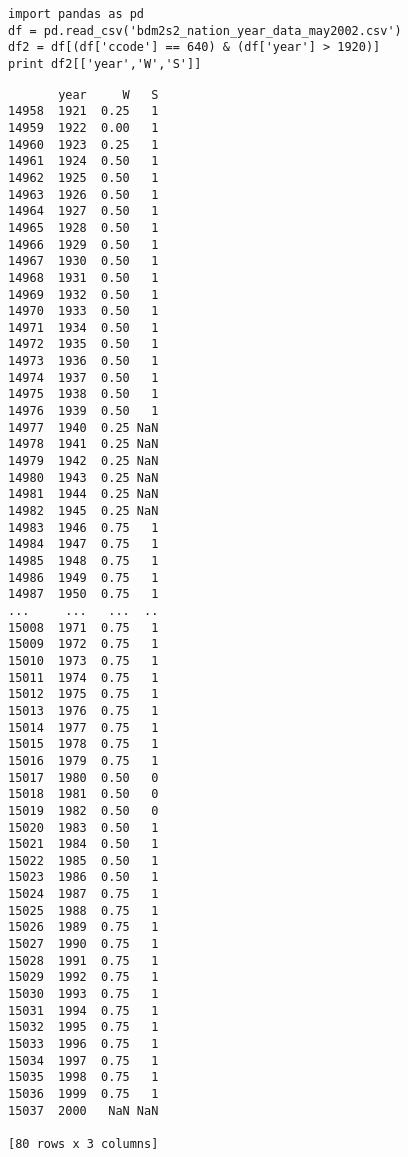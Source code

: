 \documentclass[12pt,fleqn]{article}\usepackage{common}
\begin{document}
\begin{verbatim}
import pandas as pd
df = pd.read_csv('bdm2s2_nation_year_data_may2002.csv')
df2 = df[(df['ccode'] == 640) & (df['year'] > 1920)]
print df2[['year','W','S']]
\end{verbatim}

\begin{verbatim}
       year     W   S
14958  1921  0.25   1
14959  1922  0.00   1
14960  1923  0.25   1
14961  1924  0.50   1
14962  1925  0.50   1
14963  1926  0.50   1
14964  1927  0.50   1
14965  1928  0.50   1
14966  1929  0.50   1
14967  1930  0.50   1
14968  1931  0.50   1
14969  1932  0.50   1
14970  1933  0.50   1
14971  1934  0.50   1
14972  1935  0.50   1
14973  1936  0.50   1
14974  1937  0.50   1
14975  1938  0.50   1
14976  1939  0.50   1
14977  1940  0.25 NaN
14978  1941  0.25 NaN
14979  1942  0.25 NaN
14980  1943  0.25 NaN
14981  1944  0.25 NaN
14982  1945  0.25 NaN
14983  1946  0.75   1
14984  1947  0.75   1
14985  1948  0.75   1
14986  1949  0.75   1
14987  1950  0.75   1
...     ...   ...  ..
15008  1971  0.75   1
15009  1972  0.75   1
15010  1973  0.75   1
15011  1974  0.75   1
15012  1975  0.75   1
15013  1976  0.75   1
15014  1977  0.75   1
15015  1978  0.75   1
15016  1979  0.75   1
15017  1980  0.50   0
15018  1981  0.50   0
15019  1982  0.50   0
15020  1983  0.50   1
15021  1984  0.50   1
15022  1985  0.50   1
15023  1986  0.50   1
15024  1987  0.75   1
15025  1988  0.75   1
15026  1989  0.75   1
15027  1990  0.75   1
15028  1991  0.75   1
15029  1992  0.75   1
15030  1993  0.75   1
15031  1994  0.75   1
15032  1995  0.75   1
15033  1996  0.75   1
15034  1997  0.75   1
15035  1998  0.75   1
15036  1999  0.75   1
15037  2000   NaN NaN

[80 rows x 3 columns]
\end{verbatim}
\end{document}
